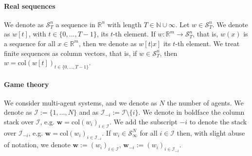 \documentclass[letterpaper, 10 pt, conference]{ieeeconf}  %
\newcommand{\rezasay}[1]{\textcolor{DarkOrchid}{[\textsc{Reza:} #1]}}
\newcommand{\R}{\mathbb{R}}
\newcommand{\N}{\mathbb{N}}
\newcommand{\mc}{\mathcal}
\newcommand{\bs}{\boldsymbol}
\newcommand{\col}{\mathrm{col}}
\newcommand{\red}[1]{\textcolor{red}{#1}}
\begin{document}
\paragraph{Real sequences} We denote as $\mc S^n_T$ a sequence in $\R^n$ with length $T\in\N\cup \infty$. Let $w\in\mc S_T^n$. We denote as $w[t]$, with $t\in\{0,...,T-1\}$, its $t$-th element. If $w: \R^m \to \mc S^n_T$, that is, $w(x)$ is a sequence for all $x\in\R^m$, then we denote as $w[t|x]$ its $t$-th element. We treat finite sequences as column vectors, that is, if $w\in\mc S^n_T$, then $w=\col(w[t])_{t\in\{0,...,T-1\}}$.
\paragraph{Game theory} We consider multi-agent systems, and we denote as $N$ the number of agents. We denote as $\mc I:=\{1,...,N\}$  and as $\mc I_{-i}:=\mc I\setminus\{i\}$. We denote in boldface the column stack over $\mc I$,  e.g. $\bs{w}=\col(w_i)_{i\in\mc I}$. We add the subscript $-i$ to denote the stack over $\mc I_{-i}$, e.g. $\bs{w}=\col(w_i)_{i\in\mc I_{-i}}$. If $w_i\in\mc S_\infty^N$ for all $i\in\mc I$ then, with slight abuse of notation, we denote $\bs{w}:=(w_i)_{i\in\mc I}$, $\bs{w}_{-i}:=(w_i)_{i\in\mc I_{-i}}$. 
\end{document}
